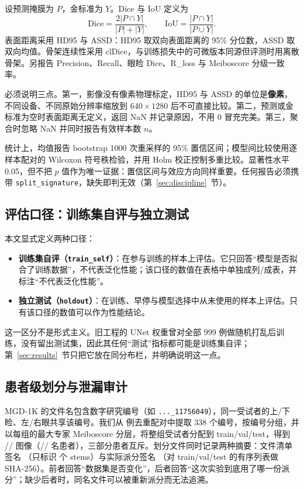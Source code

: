 设预测掩膜为 $P$，金标准为 $Y$。Dice 与 IoU 定义为
\begin{equation}
\mathrm{Dice}=\frac{2|P\cap Y|}{|P|+|Y|},\qquad
\mathrm{IoU}=\frac{|P\cap Y|}{|P\cup Y|}.
\end{equation}
表面距离采用 HD95 与 ASSD：HD95 取双向表面距离的 95\% 分位数，ASSD 取双向均值。骨架连续性采用 clDice，与训练损失中的可微版本同源但评测时用离散骨架。另报告 Precision、Recall、眼睑 Dice、R\_loss 与 Meiboscore 分级一致率。

必须说明三点。第一，影像没有像素物理标定，HD95 与 ASSD 的单位是\textbf{像素}，不同设备、不同原始分辨率缩放到 $640\times1280$ 后不可直接比较。第二，预测或金标准为空时表面距离无定义，返回 NaN 并记录原因，不用 0 冒充完美。第三，聚合时忽略 NaN 并同时报告有效样本数 $n$。

统计上，均值报告 bootstrap 1000 次重采样的 95\% 置信区间；模型间比较使用逐样本配对的 Wilcoxon 符号秩检验，并用 Holm 校正控制多重比较。显著性水平 0.05，但不把 $p$ 值作为唯一证据：置信区间与效应方向同样重要。任何报告必须携带 \texttt{split\_signature}，缺失即判无效（第~\ref{sec:discipline}~节）。

\subsection{评估口径：训练集自评与独立测试}\label{sec:scope}

本文显式定义两种口径：
\begin{itemize}
\item \textbf{训练集自评（\texttt{train\_self}）}：在参与训练的样本上评估。它只回答“模型是否拟合了训练数据”，不代表泛化性能；该口径的数值在表格中单独成列/成表，并标注“不代表泛化性能”。
\item \textbf{独立测试（\texttt{holdout}）}：在训练、早停与模型选择中从未使用的样本上评估。只有该口径的数值可以作为性能结论。
\end{itemize}

这一区分不是形式主义。旧工程的 UNet 权重曾对全部 999 例做随机打乱后训练，没有留出测试集，因此其任何“测试”指标都可能是训练集自评；第~\ref{sec:results}~节只把它放在同分布栏，并明确说明这一点。

\subsection{患者级划分与泄漏审计}\label{sec:patient-split}

MGD-1K 的文件名包含数字研究编号（如 \texttt{...\_11756049}），同一受试者的上/下睑、左/右眼共享该编号。我们从 \nTotal{} 例去重配对中提取 338 个编号，按编号分组，并以每组的最大专家 Meiboscore 分层，将整组受试者分配到 train/val/test，得到 \nTrain/\nVal/\nTest{} 图像（\nTrainPatients/\nValPatients/\nTestPatients{} 名患者），三部分患者互斥。划分文件同时记录两种摘要：文件清单签名 \splitSig（只标识 \nTotal{} 个 stems）与实际派分签名 \assignmentSig（对 train/val/test 的有序列表做 SHA-256）。前者回答“数据集是否变化”，后者回答“这次实验到底用了哪一份派分”；缺少后者时，同名文件可以被重新派分而无法追溯。

